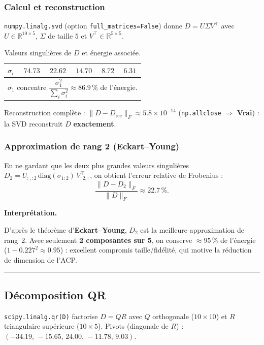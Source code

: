 \documentclass[11pt,a4paper]{article}
\newenvironment{interpret}{%
  \par\medskip\noindent
  \setlength{\fboxsep}{8pt}%
  \begin{lrbox}{\interpretbox}%
  \begin{minipage}{\dimexpr\linewidth-2\fboxsep-4pt\relax}%
  \textbf{\textcolor{boxline}{Interprétation.}}\;\ignorespaces
}{%
  \end{minipage}%
  \end{lrbox}%
  \noindent\textcolor{boxline}{\rule{3pt}{\dimexpr\ht\interpretbox+\dp\interpretbox\relax}}%
  \colorbox{boxgray}{\usebox{\interpretbox}}%
  \par\medskip
}
\begin{document}
\subsubsection{Calcul et reconstruction}
\verb|numpy.linalg.svd| (option \verb|full_matrices=False|) donne $D=U\Sigma V^{\top}$ avec
$U\in\mathbb{R}^{10\times5}$, $\Sigma$ de taille $5$ et $V^{\top}\in\mathbb{R}^{5\times5}$.

\begin{table}[H]\centering
\caption{Valeurs singulières de $D$ et énergie associée.}
\begin{tabular}{lccccc}
\toprule
$\sigma_i$ & $74.73$ & $22.62$ & $14.70$ & $8.72$ & $6.31$\\
\midrule
\multicolumn{6}{l}{$\sigma_1$ concentre $\dfrac{\sigma_1^2}{\sum_i\sigma_i^2}\approx \mathbf{86.9\,\%}$
de l'énergie.}\\
\bottomrule
\end{tabular}
\end{table}

\noindent Reconstruction complète : $\lVert D - D_{\text{rec}}\rVert_F \approx 5.8\times10^{-14}$
(\verb|np.allclose| $\Rightarrow$ \textbf{Vrai}) : la SVD reconstruit $D$ \textbf{exactement}.

\subsubsection{Approximation de rang 2 (Eckart--Young)}
En ne gardant que les deux plus grandes valeurs singulières
$D_2=U_{:,:2}\,\mathrm{diag}(\sigma_{1:2})\,V^{\top}_{:2,:}$, on obtient l'erreur relative de
Frobenius :
\[
\frac{\lVert D - D_2\rVert_F}{\lVert D\rVert_F}\approx \mathbf{22.7\,\%}.
\]
\begin{interpret}
D'après le théorème d'\textbf{Eckart--Young}, $D_2$ est la meilleure approximation de rang~2.
Avec seulement \textbf{2 composantes sur 5}, on conserve $\approx 95\,\%$ de l'énergie
($1-0.227^2\approx 0.95$) : excellent compromis taille/fidélité, qui motive la réduction de
dimension de l'ACP.
\end{interpret}

\subsection{Décomposition QR}
\verb|scipy.linalg.qr(D)| factorise $D=QR$ avec $Q$ orthogonale ($10\times10$) et $R$
triangulaire supérieure ($10\times5$). Pivots (diagonale de $R$) :
$(-34.19,\,-15.65,\,24.00,\,-11.78,\,9.03)$.
\end{document}
